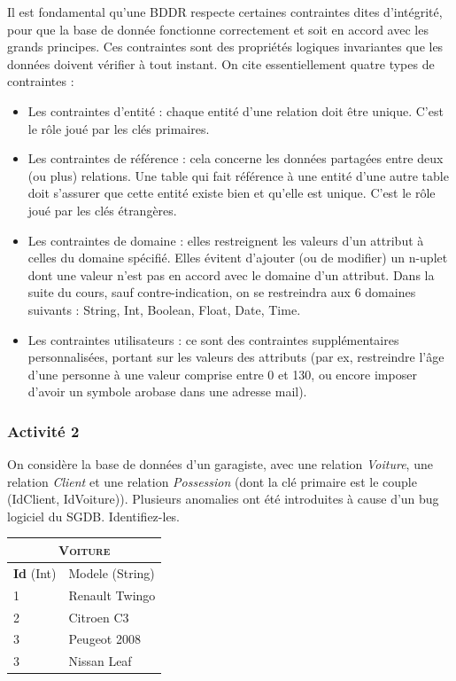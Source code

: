 \documentclass[11pt,a4paper,french,twoside]{PMCours}
\begin{document}
Il est fondamental qu'une BDDR respecte certaines contraintes dites d'intégrité, pour que la base de donnée fonctionne correctement et soit en accord avec les grands principes. Ces contraintes sont des propriétés logiques invariantes que les données doivent vérifier à tout instant. On cite essentiellement quatre types de contraintes :
\begin{itemize}
 \item Les contraintes d'entité : chaque entité d'une relation doit être unique. C'est le rôle joué par les clés primaires.
 \item Les contraintes de référence : cela concerne les données partagées entre deux (ou plus) relations. Une table qui fait référence à une entité d'une autre table doit s'assurer que cette entité existe bien et qu'elle est unique. C'est le rôle joué par les clés étrangères.
 \item Les contraintes de domaine : elles restreignent les valeurs d'un attribut à celles du domaine spécifié. Elles évitent d'ajouter (ou de modifier) un n-uplet dont une valeur n'est pas en accord avec le domaine d'un attribut. Dans la suite du cours, sauf contre-indication, on se restreindra aux 6 domaines suivants : String, Int, Boolean, Float, Date, Time.
 \item Les contraintes utilisateurs : ce sont des contraintes supplémentaires personnalisées, portant sur les valeurs des attributs (par ex, restreindre l'âge d'une personne à une valeur comprise entre 0 et 130, ou encore imposer d'avoir un symbole arobase dans une adresse mail).
\end{itemize}


\subsubsection*{Activité 2}

On considère la base de données d'un garagiste, avec une relation \emph{Voiture}, une relation \emph{Client} et une relation \emph{Possession} (dont la clé primaire est le couple (IdClient, IdVoiture)). Plusieurs anomalies ont été introduites à cause d'un bug logiciel du SGDB. Identifiez-les.

{%
\newcommand{\mc}[3]{\multicolumn{#1}{#2}{#3}}
\begin{center}
\begin{tabular}{|l|l|} \hline
\mc{2}{|c|}{\textsc{Voiture}}\\ \hline
\textbf{Id} (Int) & Modele (String)\\ \hline
1 & Renault Twingo\\ \hline
2 & Citroen C3\\ \hline
3 & Peugeot 2008\\ \hline
3 & Nissan Leaf\\ \hline
\end{tabular}
\end{center}
}%
\end{document}
